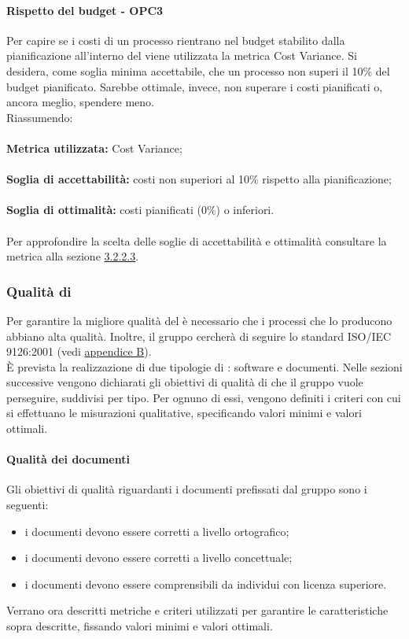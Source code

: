 \documentclass[PianoDiQualifica.tex]{subfiles}
\begin{document}
			\paragraph{Rispetto del budget - OPC3}
			Per capire se i costi di un processo rientrano nel budget stabilito dalla pianificazione all'interno del \PPdocRR{} viene utilizzata la metrica Cost Variance.
			Si desidera, come soglia minima accettabile, che un processo non superi il 10\% del budget pianificato. Sarebbe ottimale, invece, non superare i costi pianificati o, ancora meglio,
			spendere meno.\\
			Riassumendo: \\ \\
			\textbf{Metrica utilizzata:} Cost Variance; \\ \\
			\textbf{Soglia di accettabilità:} costi non superiori al 10\% rispetto alla pianificazione; \\ \\
			\textbf{Soglia di ottimalità:}  costi pianificati (0\%) o inferiori. \\ \\
			Per approfondire la scelta delle soglie di accettabilità e ottimalità consultare la metrica alla sezione \hyperlink{Cost_m}{3.2.2.3}.
			
		\subsubsection{Qualità di }
		Per garantire la migliore qualità del  è necessario che i processi che lo producono abbiano alta qualità.
		Inoltre, il gruppo \GRUPPO{} cercherà di seguire lo standard ISO/IEC 9126:2001 (vedi \hyperlink{ISOIEC}{appendice B}). \\
		È prevista la realizzazione di due tipologie di : software e documenti.
		Nelle sezioni successive vengono dichiarati gli obiettivi di qualità di  che il gruppo vuole perseguire, suddivisi per tipo.
		Per ognuno di essi, vengono definiti i criteri con cui si effettuano le misurazioni qualitative, specificando valori minimi e valori ottimali.
		
			\paragraph{Qualità dei documenti}
			Gli obiettivi di qualità riguardanti i documenti prefissati dal gruppo \GRUPPO{} sono i seguenti:
			\begin{itemize}
				\item i documenti devono essere corretti a livello ortografico;
				\item i documenti devono essere corretti a livello concettuale;
				\item i documenti devono essere comprensibili da individui con licenza superiore.
			\end{itemize}
			Verrano ora descritti metriche e criteri utilizzati per garantire le caratteristiche sopra descritte, fissando valori minimi e valori ottimali.
			
\end{document}
